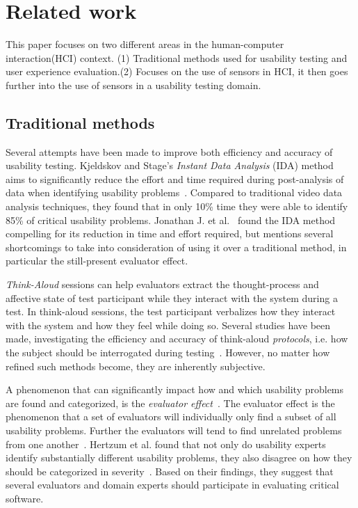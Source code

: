 \section{Related work}
This paper focuses on two different areas in the human-computer interaction(HCI) context. (1) Traditional methods used for usability testing and user experience evaluation.(2) Focuses on the use of sensors in HCI, it then goes further into the use of sensors in a usability testing domain.

\subsection{Traditional methods} %
Several attempts have been made to improve both efficiency and accuracy of
usability testing. Kjeldskov and Stage's \textit{Instant Data
Analysis} (IDA) method aims to significantly reduce the effort and time required
during post-analysis of data when identifying usability
problems~\cite{instant_data_analysis}. Compared to traditional video data
analysis techniques, they found that in only 10\% time they were able to
identify 85\% of critical usability problems. Jonathan J. et
al.~\cite{use_of_TA_and_IDA} found the IDA
method compelling for its reduction in time and effort required, but mentions
several shortcomings to take into consideration of using it over a traditional
method, in particular the still-present evaluator effect.

\textit{Think-Aloud} sessions can help evaluators extract the thought-process
and affective state of test participant while they interact with the system
during a test. In think-aloud sessions, the test participant verbalizes how
they interact with the system and how they feel while doing so.  Several studies
have been made, investigating the efficiency and accuracy of think-aloud
\textit{protocols}, i.e. how the subject should be interrogated during
testing~\cite{two_think_aloud_protocols_study}. However, no matter how refined
such methods become, they are inherently subjective.

A phenomenon that can significantly impact how and which usability problems are
found and categorized, is the \textit{evaluator effect}~\cite{eval_effect}.
The evaluator effect is the phenomenon that a set of evaluators will individually only find a subset of all usability problems.
Further the evaluators will tend to find unrelated problems from one another~\cite{eval_effect}.
Hertzum et al. found that not only do
usability experts identify substantially different usability problems, they also
disagree on how they should be categorized in
severity~\cite{eval_effect_research}. Based on their findings, they suggest that
several evaluators and domain experts should participate in evaluating critical
software.

